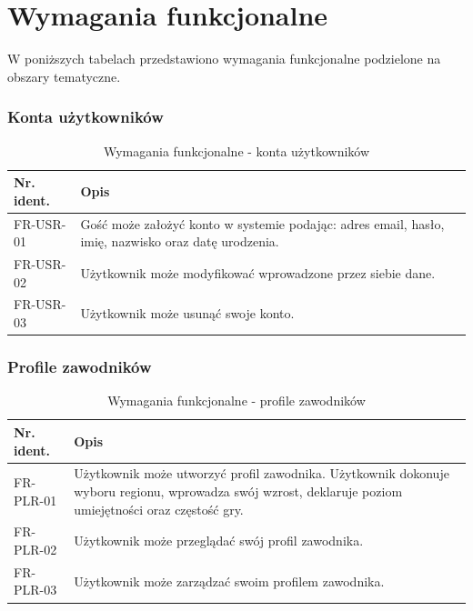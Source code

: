 \section{Wymagania funkcjonalne}

W poniższych tabelach przedstawiono wymagania funkcjonalne podzielone na obszary tematyczne.

\subsubsection{Konta użytkowników}

\begin{table}[H]
\centering\small
\caption{Wymagania funkcjonalne - konta użytkowników}
\label{tab:szablon}
\begin{tabularx}{\linewidth}{|p{.2\linewidth}|X|}\hline
Nr. ident. & Opis \\ \hline\hline

FR-USR-01 & Gość może założyć konto w systemie podając: adres email, hasło, imię, nazwisko oraz datę urodzenia. \\ \hline
FR-USR-02 & Użytkownik może modyfikować wprowadzone przez siebie dane.  \\ \hline
FR-USR-03 & Użytkownik może usunąć swoje konto.  \\ \hline

\end{tabularx}
\end{table}

\subsubsection{Profile zawodników}


\begin{table}[H]
\centering\small
\caption{Wymagania funkcjonalne - profile zawodników}
\label{tab:szablon}
\begin{tabularx}{\linewidth}{|p{.2\linewidth}|X|}\hline
Nr. ident. & Opis \\ \hline\hline

FR-PLR-01 & Użytkownik może utworzyć profil zawodnika. Użytkownik dokonuje wyboru regionu, wprowadza swój wzrost, deklaruje poziom umiejętności oraz częstość gry.   \\ \hline
FR-PLR-02 & Użytkownik może przeglądać swój profil zawodnika.\\ \hline
FR-PLR-03 & Użytkownik może zarządzać swoim profilem zawodnika. \\ \hline

\end{tabularx}
\end{table}

